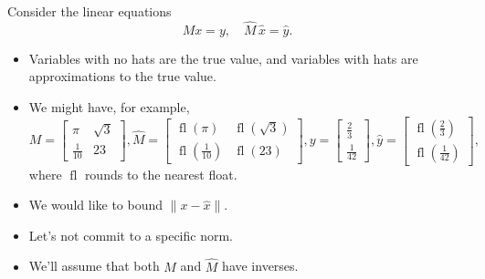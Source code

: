 \documentclass[usenames,dvipsnames,fleqn]{beamer}
\DeclareMathOperator{\fl}{fl}
\theoremstyle{definition}
\begin{document}
\begin{frame}
Consider the linear equations
\[
   M x = y, \quad \widehat M  \, \widehat x = \widehat y.
\]

\begin{itemize}

\item Variables with no hats are the true value, and variables with hats are approximations to the true value.

\item We might have, for example,
\[
   M = \begin{bmatrix} \pi & \sqrt{3} \\ \frac{1}{10} & 23 \end{bmatrix},  
   \widehat M =   \begin{bmatrix} \fl(\pi) & \fl(\sqrt{3}) \\ \fl(\frac{1}{10}) & \fl(23) \end{bmatrix},
   y = \begin{bmatrix} \frac{2}{3} \\ \frac{1}{42} \end{bmatrix}, 
   \widehat y = \begin{bmatrix} \fl(\frac{2}{3}) \\ \fl(\frac{1}{42}) \end{bmatrix},
   \]
where \(\fl\) rounds to the nearest float.

\item We would like to bound \( \| x - \widehat x \| \).

\item Let's not commit to a specific norm.

\item We'll assume that both \(M\) and \(\widehat M \) have inverses.
\end{itemize}

\end{frame}
\end{document}

